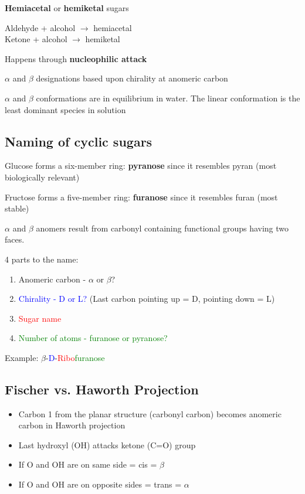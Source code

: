\documentclass[letterpaper, 12pt]{article}
\begin{document}
\textbf{Hemiacetal} or \textbf{hemiketal} sugars

Aldehyde + alcohol $\to$ hemiacetal \\
Ketone + alcohol $\to$ hemiketal

Happens through \textbf{nucleophilic attack}

$\alpha$ and $\beta$ designations based upon chirality at anomeric carbon

$\alpha$ and $\beta$ conformations are in equilibrium in water. The linear conformation is the least dominant species in solution

\subsection*{Naming of cyclic sugars}
Glucose forms a six-member ring: \textbf{pyranose} since it resembles pyran (most biologically relevant)

Fructose forms a five-member ring: \textbf{furanose} since it resembles furan (most stable)

$\alpha$ and $\beta$ anomers result from carbonyl containing functional groups having two faces.

4 parts to the name:

\begin{enumerate}
\item Anomeric carbon - $\alpha$ or $\beta$?
\item \textcolor{blue}{Chirality - D or L?} (Last carbon pointing up = D, pointing down = L)
\item \textcolor{red}{Sugar name}
\item \textcolor{green}{Number of atoms - furanose or pyranose?}
\end{enumerate}

Example: $\beta$-\textcolor{blue}{D}-\textcolor{red}{Ribo}\textcolor{green}{furanose}

\subsection*{Fischer vs. Haworth Projection}

\begin{itemize}

\item Carbon 1 from the planar structure (carbonyl carbon) becomes anomeric carbon in Haworth projection

\item Last hydroxyl (OH) attacks ketone (C=O) group

\item If O and OH are on same side = cis = $\beta$

\item If O and OH are on opposite sides = trans = $\alpha$

\end{itemize}
\end{document}
